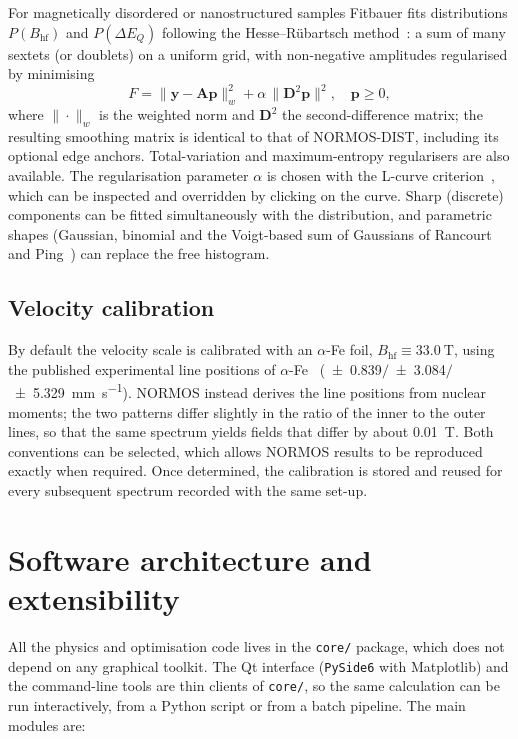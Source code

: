 \documentclass[smallcondensed]{svjour3}
\begin{document}
For magnetically disordered or nanostructured samples Fitbauer fits
distributions $P(B_\mathrm{hf})$ and $P(\Delta E_Q)$ following the
Hesse--R\"{u}bartsch method~\cite{Hesse1974}: a sum of many sextets (or
doublets) on a uniform grid, with non-negative amplitudes regularised by
minimising
\begin{equation}
  F = \|\mathbf{y} - \mathbf{A}\mathbf{p}\|_w^2
    + \alpha\,\|\mathbf{D}^2\mathbf{p}\|^2, \quad \mathbf{p}\geq 0 ,
  \label{eq:tikhonov}
\end{equation}
where $\|\cdot\|_w$ is the weighted norm and $\mathbf{D}^2$ the
second-difference matrix; the resulting smoothing matrix is identical to
that of NORMOS-DIST, including its optional edge anchors.
Total-variation and maximum-entropy regularisers are also available.
The regularisation parameter $\alpha$ is chosen with the L-curve
criterion~\cite{Hansen1992}, which can be inspected and overridden by
clicking on the curve.
Sharp (discrete) components can be fitted simultaneously with the
distribution, and parametric shapes (Gaussian, binomial and the
Voigt-based sum of Gaussians of Rancourt and Ping~\cite{Rancourt1991}) can
replace the free histogram.

\subsection{Velocity calibration}
\label{sec:calib}

By default the velocity scale is calibrated with an $\alpha$-Fe foil,
$B_\mathrm{hf} \equiv \SI{33.0}{\tesla}$, using the published experimental
line positions of $\alpha$-Fe~\cite{Kalvius1969}
(\SI{\pm 0.839}{}$/$\SI{\pm 3.084}{}$/$\SI{\pm 5.329}{\milli\metre\per\second}).
NORMOS instead derives the line positions from nuclear moments; the two
patterns differ slightly in the ratio of the inner to the outer lines, so
that the same spectrum yields fields that differ by about
\SI{0.01}{\tesla}. Both conventions can be selected, which allows NORMOS
results to be reproduced exactly when required.
Once determined, the calibration is stored and reused for every
subsequent spectrum recorded with the same set-up.

\section{Software architecture and extensibility}
\label{sec:arch}

All the physics and optimisation code lives in the \texttt{core/} package,
which does not depend on any graphical toolkit. The Qt interface
(\texttt{PySide6} with Matplotlib) and the command-line tools are thin
clients of \texttt{core/}, so the same calculation can be run
interactively, from a Python script or from a batch pipeline.
The main modules are:
\end{document}
